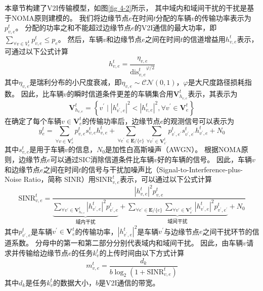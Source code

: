 本章节构建了V2I传输模型，如图\ref{fig 4-2}所示， 其中域内和域间干扰的干扰是基于NOMA原则建模的。
我们将边缘节点$e$在时间$t$分配的车辆$v$的传输功率表示为$p_{v, e}^{t}$。
分配的功率之和不能超过边缘节点$e$的V2I通信的最大功率，即$\sum_{\forall v \in {V}_{e}^{t}} p_{v, e}^{t} \leq p_{e}$。
然后，车辆$v$和边缘节点$e$之间在时间$t$的信道增益用$h_{v, e}^t$表示，可通过以下公式计算\cite{sun2020performance}
\begin{equation}
	h_{v, e}^t = \frac{\eta_{v, e}}{{\operatorname{dis}_{v, e}^{t}}^{\varphi/2}}
\end{equation}
\noindent 其中$\eta_{v, e}$是瑞利分布的小尺度衰减，即$\eta_{v, e} \sim \mathcal{CN}(0, 1)$，$\varphi$是大尺度路径损耗指数。
因此，比车辆$v$的瞬时信道条件更差的车辆集合用$\mathbf{V}_{h_{v, e}}^{t}$表示，其表示为
\begin{equation}
	\mathbf{V}_{h_{v, e}}^{t} = \left \{ v^{\prime} \mid  \left|h_{v^{\prime}, e}^t \right|^{2} < \left| h_{v, e}^t\right |^{2} , \forall v^{\prime} \in \mathbf{V}_{e}^{t} \right \}
\end{equation}
在确定了每个车辆$v \in \mathbf{V}_{e}^{t}$的传输功率后，边缘节点$e$的观测信号可以表示为\cite{islam2017power}
\begin{equation}
	y_e^{t} = \sum_{\forall v \in \mathbf{V}_{e}^{t}} p_{v, e}^{t} s_{v, e}^{t} h_{v, e}^t + \sum\limits_{\forall e^{\prime} \in \mathbf{E} / \{e\}} \sum\limits_{\forall v^{\prime} \in \mathbf{V}_{e^{\prime}}^{t}} p_{v^{\prime}, e^{\prime}}^{t} s_{v^{\prime}, e^{\prime}}^{t} h_{v^{\prime}, e}^t + N_{0}
\end{equation}
其中$s_{v, e}^{t}$是用于车辆$v$的信息，$N_{0}$是加性白高斯噪声（AWGN）。
根据NOMA原则，边缘节点$e$可以通过SIC消除信道条件比车辆$v$好的车辆的信号。
因此，车辆$v$和边缘节点$e$之间在时间$t$的信号与干扰加噪声比（Signal-to-Interference-plus-Noise Ratio，简称 SINR）用$\mathrm{SINR}_{v, e}^t$表示，可以通过以下公式计算
\begin{equation}
	\mathrm{SINR}_{v, e}^t = \frac{ |h_{v, e}^t| ^{2}  p_{v, e}^{t}}{ \underbrace{\sum\limits_{\forall v^{\prime} \in \mathbf{V}_{h_{v, e}}^{t}} |h_{v^{\prime}, e}^t|^2 p_{v^{\prime}, e}^{t}}_{\text {域内干扰}} + \underbrace{\sum\limits_{\forall e^{\prime} \in \mathbf{E} / \{e\}} \sum\limits_{\forall v^{\prime} \in \mathbf{V}_{e^{\prime}}^{t}} |h_{v^{\prime}, e}^t|^2 p_{v^{\prime}, e^{\prime}}^{t}}_{\text {域间干扰}} + N_{0}}
\end{equation}
其中$p_{v^{\prime}, e}^{t}$是车辆$v^{\prime} \in \mathbf{V}_{e}^{t}$的传输功率，$|h_{v^{\prime}, e}^t|^2$是车辆$v^{\prime}$与边缘节点$e$之间干扰环节的信道系数。
分母中的第一和第二部分分别代表域内和域间干扰。
因此，由车辆$v$请求并传输给边缘节点$e$的任务$k_{v}^{t}$的上传时间由以下方式计算
\begin{equation}
	m_{v, e}^{t} = \frac{d_{k}}{b  \log _{2}\left(1+\mathrm{SINR}_{v, e}^t\right)}
\end{equation}
其中$d_k$是任务$k_{v}^{t}$的数据大小，$b$是V2I通信的带宽。

